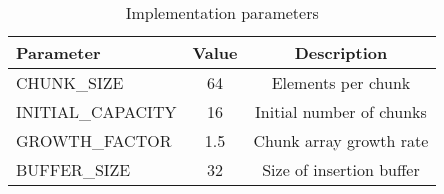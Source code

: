 \begin{table}[t]
\centering
\begin{tabular}{|l|c|c|}
\hline
\textbf{Parameter} & \textbf{Value} & \textbf{Description} \\
\hline
CHUNK\_SIZE & 64 & Elements per chunk \\
\hline
INITIAL\_CAPACITY & 16 & Initial number of chunks \\
\hline
GROWTH\_FACTOR & 1.5 & Chunk array growth rate \\
\hline
BUFFER\_SIZE & 32 & Size of insertion buffer \\
\hline
\end{tabular}
\caption{Implementation parameters}
\label{tab:parameters}
\end{table} 